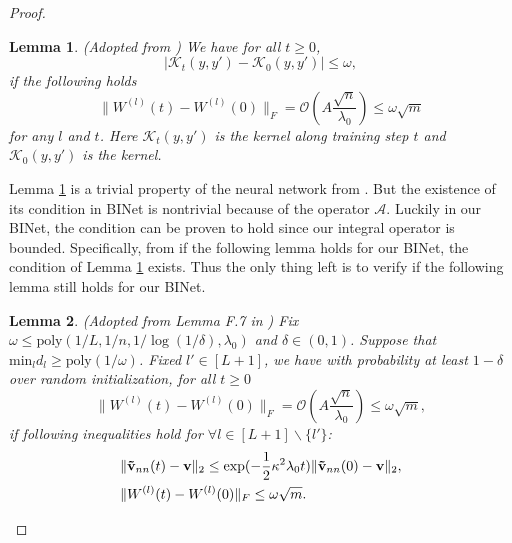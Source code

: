 \documentclass[hyperref]{article}
\numberwithin{equation}{section}
\theoremstyle{nonumberplain}
\newtheorem{proof}{Proof}
\newtheorem{lemma}{Lemma}[section]
\begin{document}
\begin{proof}
		
		\begin{lemma}(Adopted from \cite{arora2019exact})
			We have for all $t\geq 0$, $$|\mathcal{K}_t(y,y')-\mathcal{K}_0(y,y')|\leq \omega,$$ if  the following holds 
			\begin{equation}
				\|W^{(l)}(t)-W^{(l)}(0)\|_F = \mathcal{O}(A\frac{\sqrt{n}}{\lambda_0})\leq \omega\sqrt{m}
			\end{equation}
			for any $l$ and $t$.
			Here $\mathcal{K}_t(y,y')$ is the kernel along training step $t$ and $\mathcal{K}_0(y,y')$ is the kernel.
			\label{lemma.kernel}
		\end{lemma}
		
		
		Lemma \ref{lemma.kernel} is a trivial property of the neural network from \cite{arora2019exact}. But the existence of its condition in BINet is nontrivial because of the operator $\mathcal{A}$. Luckily in our BINet, the condition can be proven to hold since our integral operator is bounded. Specifically, from \cite{arora2019exact} if the following lemma holds for our BINet, the condition of Lemma \ref{lemma.kernel} exists. Thus the only thing left is to verify if the following lemma still holds for our BINet.
		
		\begin{lemma}(Adopted from Lemma F.7 in \cite{arora2019exact})
			Fix $\omega\leq \text{poly}(1/L,1/n,1/\log(1/\delta),\lambda_0)$ and $\delta\in(0,1)$. Suppose that $\text{min}_l{d_l}\geq \text{poly}(1/\omega)$. Fixed $l'\in[L+1]$, we have with probability at least $1-\delta$ over random initialization, for all $t\geq 0$
			\begin{equation}
				\|W^{(l)}(t)-W^{(l)}(0)\|_F = \mathcal{O}(A\frac{\sqrt{n}}{\lambda_0})\leq \omega\sqrt{m},
			\end{equation}
			if following inequalities hold for $\forall l\in[L+1]\backslash \{l'\}$:
			\begin{align}
				\begin{split}
					&\|{\bf \tilde{v}}_{nn}(t)-{\bf v}\|_2\leq \exp(-\frac{1}{2}\kappa^2\lambda_0t)\|{\bf \tilde{v}}_{nn}(0)-{\bf v}\|_2,\\
					&\|W^{(l)}(t)-W^{(l)}(0)\|_F \leq \omega\sqrt{m}.
				\end{split}
			\end{align}
		\end{lemma}
		

\end{proof}
\end{document}
